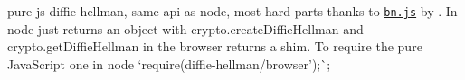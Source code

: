 pure js diffie-\/hellman, same api as node, most hard parts thanks to \href{https://www.npmjs.org/package/bn.js}{\tt bn.\+js} by \href{https://github.com/indutny}{\tt }. In node just returns an object with {\ttfamily crypto.\+create\+Diffie\+Hellman} and {\ttfamily crypto.\+get\+Diffie\+Hellman} in the browser returns a shim. To require the pure Java\+Script one in node `require(\textquotesingle{}diffie-\/hellman/browser');\`{}; 